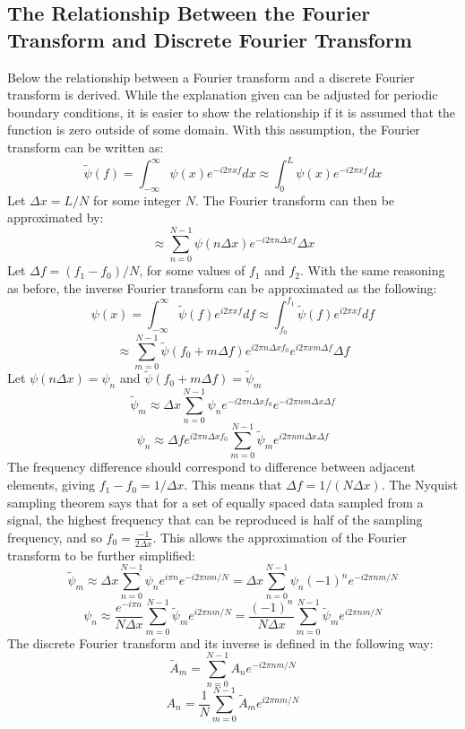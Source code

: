\documentclass[a4paper,12pt]{report}
\begin{document}
\subsection{The Relationship Between the Fourier Transform and Discrete Fourier Transform}
Below the relationship between a Fourier transform and a discrete Fourier transform is derived. While the explanation given can be adjusted for periodic boundary conditions, it is easier to show the relationship if it is assumed that the function is zero outside of some domain. With this assumption, the Fourier transform can be written as:
$$\tilde \psi(f) = \int_{-\infty}^\infty \psi(x) e^{-i2\pi xf} dx \approx \int_0^L\psi(x)e^{-i2\pi x f}dx$$
Let $\Delta x=L/N$ for some integer $N$. The Fourier transform can then be approximated by:
$$\approx \sum\limits_{n=0}^{N-1}\psi(n \Delta x) e^{-i 2\pi n \Delta x f}\Delta x$$
Let $\Delta f = (f_1-f_0)/N$, for some values of $f_1$ and $f_2$. With the same reasoning as before, the inverse Fourier transform can be approximated as the following:
$$\psi(x) = \int_{-\infty}^\infty \tilde\psi(f)e^{i 2\pi x f} df \approx \int_{f_0}^{f_1}\tilde\psi(f)e^{i 2\pi x f}df $$
$$\approx \sum\limits_{m=0}^{N-1}\tilde\psi(f_0+m\Delta f)e^{i 2\pi n\Delta x f_0} e^{i 2\pi x m\Delta f}\Delta f$$
Let $\psi(n\Delta x) = \psi_n$ and $\tilde\psi(f_0+m\Delta f) = \tilde \psi_m$
$$\tilde \psi_m\approx \Delta x \sum\limits_{n=0}^{N-1}\psi_n e^{-i 2\pi n \Delta x f_0}e^{-i 2\pi n m \Delta x \Delta f}$$
$$\psi_n  \approx \Delta f e^{i 2\pi n\Delta x f_0}\sum\limits_{m=0}^{N-1}\tilde\psi_m e^{i 2\pi n m \Delta x \Delta f}$$
The frequency difference should correspond to difference between adjacent elements, giving $f_1-f_0=1/\Delta x$. This means that $\Delta f = 1/(N\Delta x)$. The Nyquist sampling theorem says that for a set of equally spaced data sampled from a signal, the highest frequency that can be reproduced is half of the sampling frequency, and so $f_0=\frac{-1}{2\Delta x}$. This allows the approximation of the Fourier transform to be further simplified:
$$\tilde \psi_m\approx \Delta x \sum\limits_{n=0}^{N-1}\psi_n e^{i \pi n }e^{-i 2\pi n m/N}=\Delta x \sum\limits_{n=0}^{N-1}\psi_n (-1)^n e^{-i 2\pi n m/N}$$
$$\psi_n  \approx \frac{e^{-i \pi n}}{N\Delta x}\sum\limits_{m=0}^{N-1}\tilde\psi_m e^{i 2\pi n m/N}=\frac{(-1)^n }{N\Delta x}\sum\limits_{m=0}^{N-1}\tilde\psi_m e^{i 2\pi n m/N}$$
The discrete Fourier transform and its inverse is defined in the following way:
$$\tilde A_m =  \sum\limits_{n=0}^{N-1} A_n e^{-i 2\pi n m/N}$$
$$A_n  = \frac{1}{N}\sum\limits_{m=0}^{N-1}\tilde A_m e^{i 2\pi n m/N}$$
\end{document}
